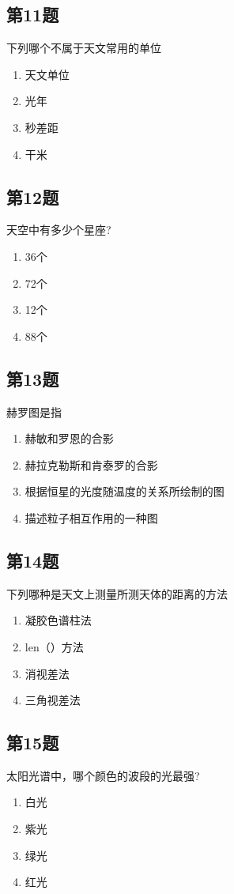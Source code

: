 \documentclass[hyperref,UTF8]{ctexart}
\begin{document}
\subsection*{第11题} 下列哪个不属于天文常用的单位
\begin{enumerate}[\label= A.]
    \item 天文单位\item 光年\item 秒差距\item 干米
\end{enumerate} 

\subsection*{第12题} 天空中有多少个星座?
\begin{enumerate}[\label= A.]
    \item 36个\item 72个\item 12个\item 88个
\end{enumerate} 
\newpage
\subsection*{第13题} 赫罗图是指\begin{enumerate}[\label= A.]
    \item 赫敏和罗恩的合影\item 赫拉克勒斯和肯泰罗的合影\item 根据恒星的光度随温度的关系所绘制的图\item 描述粒子相互作用的一种图
\end{enumerate} 

\subsection*{第14题} 
下列哪种是天文上测量所测天体的距离的方法
\begin{enumerate}[\label= A.]
    \item 凝胶色谱柱法\item len（）方法\item 消视差法\item 三角视差法
\end{enumerate} 

\subsection*{第15题} 太阳光谱中，哪个颜色的波段的光最强?
\begin{enumerate}[\label= A.]
    \item 白光
    \item 紫光
    \item 绿光
    \item 红光
\end{enumerate}
\newpage
\end{document}
